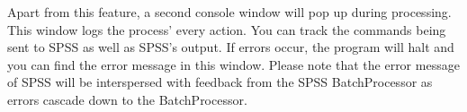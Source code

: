 \documentclass[]{article}
\begin{document}
\begin{minipage}{\linewidth}%
\end{minipage}
Apart from this feature, a second console window will pop up during processing. This window logs the process' every action. You can track the commands being sent to SPSS as well as SPSS's output. If errors occur, the program will halt and you can find the error message in this window. Please note that the error message of SPSS will be interspersed with feedback from the SPSS BatchProcessor as errors cascade down to the BatchProcessor. 
\end{document}
